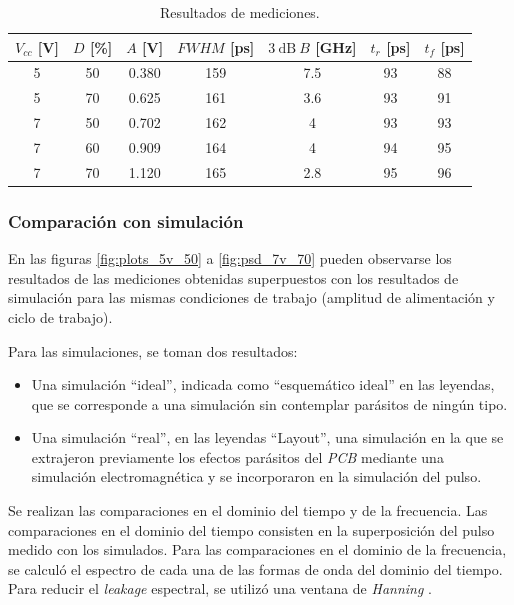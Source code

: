 \begin{table}
\centering
\begin{tabular}{ccccccc}
\hline
$V_{cc}$ [\unit{\volt}] & $D$ [\unit{\percent}] & $A$ [\unit{\volt}] &
    $FWHM$ [\unit{\pico\second}] & $\qty{3}{\dB} \ B$ [\unit{\giga\hertz}]& $t_r$
    [\unit{\pico\second}]& $t_f$ [\unit{\pico\second}]\\
\hline
5 & 50 & 0.380 & 159 & 7.5 & 93 & 88 \\
5 & 70 & 0.625 & 161 & 3.6 & 93 & 91 \\
7 & 50 & 0.702 & 162 & 4   & 93 & 93 \\
7 & 60 & 0.909 & 164 & 4   & 94 & 95 \\
7 & 70 & 1.120 & 165 & 2.8 & 95 & 96 \\
\hline
\end{tabular}
\caption{Resultados de mediciones.}
\label{tab:mediciones_resultados}
\end{table}

\subsubsection{Comparación con simulación}
\label{sec:comp_simulacion}

En las figuras \ref{fig:plots_5v_50} a \ref{fig:psd_7v_70} pueden observarse los resultados de las
mediciones obtenidas superpuestos con los resultados de simulación para las mismas condiciones de
trabajo (amplitud de alimentación y ciclo de trabajo).

Para las simulaciones, se toman dos resultados:

\begin{itemize}
    \item Una simulación ``ideal'', indicada como ``esquemático ideal'' en las
      leyendas, que se corresponde a una simulación sin contemplar parásitos de
      ningún tipo.
    \item Una simulación ``real'', en las leyendas ``Layout'', una simulación en
      la que se extrajeron previamente los efectos parásitos del \textit{PCB}
      mediante una simulación electromagnética y se incorporaron en la
      simulación del pulso.
\end{itemize}

Se realizan las comparaciones en el dominio del tiempo y de la frecuencia. Las
comparaciones en el dominio del tiempo consisten en la superposición del pulso
medido con los simulados. Para las comparaciones en el dominio de la frecuencia,
se calculó el espectro de cada una de las formas de onda del dominio del tiempo.
Para reducir el \textit{leakage} espectral, se utilizó una ventana de
\textit{Hanning} \cite{oppenheim1999dsp}.

